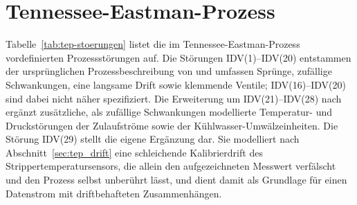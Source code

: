 \section{Tennessee-Eastman-Prozess}\label{app:tep}
%
Tabelle~\ref{tab:tep-stoerungen} listet die im Tennessee-Eastman-Prozess vordefinierten Prozessstörungen auf. Die Störungen IDV(1)--IDV(20) entstammen der ursprünglichen Prozessbeschreibung von \cite{downs.1993} und umfassen Sprünge, zufällige Schwankungen, eine langsame Drift sowie klemmende Ventile; IDV(16)--IDV(20) sind dabei nicht näher spezifiziert. Die Erweiterung um IDV(21)--IDV(28) nach \cite{bathelt.2015} ergänzt zusätzliche, als zufällige Schwankungen modellierte Temperatur- und Druckstörungen der Zulaufströme sowie der Kühlwasser-Umwälzeinheiten. Die Störung IDV(29) stellt die eigene Ergänzung dar. Sie modelliert nach Abschnitt~\ref{sec:tep_drift} eine schleichende Kalibrierdrift des Strippertemperatursensors, die allein den aufgezeichneten Messwert verfälscht und den Prozess selbst unberührt lässt, und dient damit als Grundlage für einen Datenstrom mit driftbehafteten Zusammenhängen.
%
